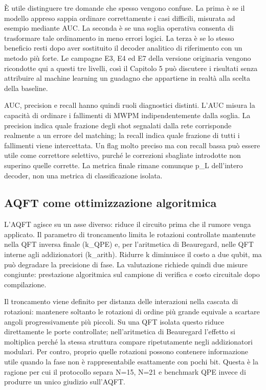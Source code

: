 È utile distinguere tre domande che spesso vengono confuse. La prima è se il modello appreso sappia ordinare correttamente i casi difficili, misurata ad esempio mediante AUC. La seconda è se una soglia operativa consenta di trasformare tale ordinamento in meno errori logici. La terza è se lo stesso beneficio resti dopo aver sostituito il decoder analitico di riferimento con un metodo più forte. Le campagne E3, E4 ed E7 della versione originaria vengono ricondotte qui a questi tre livelli, così il Capitolo 5 può discutere i risultati senza attribuire al machine learning un guadagno che appartiene in realtà alla scelta della baseline.

AUC, precision e recall hanno quindi ruoli diagnostici distinti. L'AUC misura la capacità di ordinare i fallimenti di MWPM indipendentemente dalla soglia. La precision indica quale frazione degli shot segnalati dalla rete corrisponde realmente a un errore del matching; la recall indica quale frazione di tutti i fallimenti viene intercettata. Un flag molto preciso ma con recall bassa può essere utile come correttore selettivo, purché le correzioni sbagliate introdotte non superino quelle corrette. La metrica finale rimane comunque p\_L dell'intero decoder, non una metrica di classificazione isolata.

\subsection{AQFT come ottimizzazione algoritmica}\label{sec:finale_3_4_4}

L'AQFT agisce su un asse diverso: riduce il circuito prima che il rumore venga applicato. Il parametro di troncamento limita le rotazioni controllate mantenute nella QFT inversa finale (k\_QPE) e, per l'aritmetica di Beauregard, nelle QFT interne agli addizionatori (k\_arith). Ridurre k diminuisce il costo a due qubit, ma può degradare la precisione di fase. La valutazione richiede quindi due misure congiunte: prestazione algoritmica sul campione di verifica e costo circuitale dopo compilazione.

Il troncamento viene definito per distanza delle interazioni nella cascata di rotazioni: mantenere soltanto le rotazioni di ordine più grande equivale a scartare angoli progressivamente più piccoli. Su una QFT isolata questo riduce direttamente le porte controllate; nell'aritmetica di Beauregard l'effetto si moltiplica perché la stessa struttura compare ripetutamente negli addizionatori modulari. Per contro, proprio quelle rotazioni possono contenere informazione utile quando la fase non è rappresentabile esattamente con pochi bit. Questa è la ragione per cui il protocollo separa N=15, N=21 e benchmark QPE invece di produrre un unico giudizio sull'AQFT.

